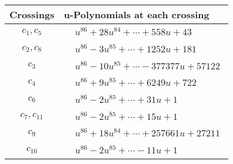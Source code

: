 \documentclass[1p]{elsarticle_modified}
\theoremstyle{definition}
\begin{document}
\begin{tabular}{m{50pt}|m{274pt}}
Crossings & \hspace{64pt}u-Polynomials at each crossing \\
\hline $$\begin{aligned}c_{1},c_{5}\end{aligned}$$&$\begin{aligned}
&u^{86}+28 u^{84}+\cdots+558 u+43
\end{aligned}$\\
\hline $$\begin{aligned}c_{2},c_{8}\end{aligned}$$&$\begin{aligned}
&u^{86}-3 u^{85}+\cdots+1252 u+181
\end{aligned}$\\
\hline $$\begin{aligned}c_{3}\end{aligned}$$&$\begin{aligned}
&u^{86}-10 u^{85}+\cdots-377377 u+57122
\end{aligned}$\\
\hline $$\begin{aligned}c_{4}\end{aligned}$$&$\begin{aligned}
&u^{86}+9 u^{85}+\cdots+6249 u+722
\end{aligned}$\\
\hline $$\begin{aligned}c_{6}\end{aligned}$$&$\begin{aligned}
&u^{86}-2 u^{85}+\cdots+31 u+1
\end{aligned}$\\
\hline $$\begin{aligned}c_{7},c_{11}\end{aligned}$$&$\begin{aligned}
&u^{86}-2 u^{85}+\cdots+15 u+1
\end{aligned}$\\
\hline $$\begin{aligned}c_{9}\end{aligned}$$&$\begin{aligned}
&u^{86}+18 u^{84}+\cdots+257661 u+27211
\end{aligned}$\\
\hline $$\begin{aligned}c_{10}\end{aligned}$$&$\begin{aligned}
&u^{86}-2 u^{85}+\cdots-11 u+1
\end{aligned}$\\
\hline
\end{tabular}\\~\\
\end{document}
